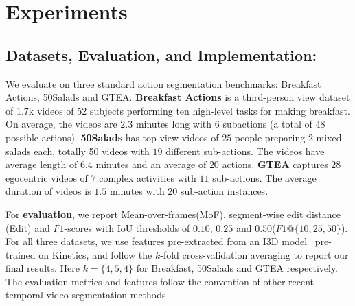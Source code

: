 \documentclass[10pt,twocolumn,letterpaper]{article}
\begin{document}
\section{Experiments}\label{sec:results}

\subsection{Datasets, Evaluation, and Implementation:} 
We evaluate on three standard action segmentation benchmarks: Breakfast Actions\cite{kuehne2014language}, 50Salads\cite{stein2013combining} and GTEA\cite{gtea-fathi2011learning}.
\textbf{Breakfast Actions} is a third-person view dataset of 1.7k videos of 52 subjects performing ten high-level tasks for making breakfast.  
On average, the videos are $2.3$ minutes long with $6$ subactions (a total of 48 possible actions).
\textbf{50Salads} has top-view videos of $25$ people preparing $2$ mixed salads each, totally 50 videos with $19$ different sub-actions. 
The videos have average length of $6.4$ minutes and an average of $20$ actions. 
\textbf{GTEA} captures $28$ egocentric videos of $7$ complex activities 
with $11$ sub-actions. The average duration of videos is $1.5$ minutes with $20$ sub-action instances. 

For \textbf{evaluation}, we report Mean-over-frames(MoF), segment-wise edit distance (Edit) and $F1$-scores with IoU thresholds of $0.10$, $0.25$ and $0.50$($F1@\{10, 25, 50\}$). For all three datasets, we use features pre-extracted from an I3D model~\cite{carreira2017quo} pre-trained on Kinetics, and follow the $k$-fold cross-validation averaging to report our final results. Here $k=\{4, 5, 4\}$ for Breakfast, 50Salads and GTEA respectively. 
The evaluation metrics and features follow the convention of other recent temporal video segmentation methods~\cite{sener2020temporal, li2020ms, wang2020boundary, ishikawa2021alleviating}. 
\end{document}
